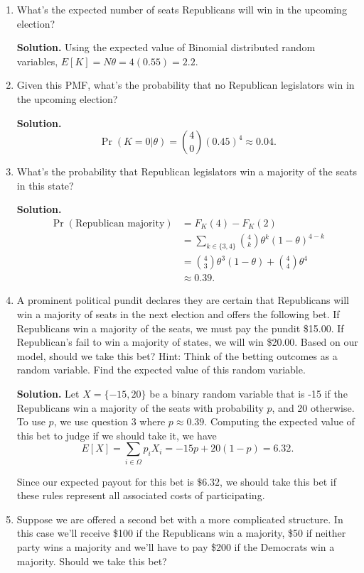 \documentclass[12pt]{article}
\begin{document}
\begin{enumerate}
    \item What’s the expected number of seats Republicans will win in the upcoming election?

    \textbf{Solution.} Using the expected value of Binomial distributed random variables, $E[K]=N\theta = 4(0.55)=2.2$.

    \item Given this PMF, what’s the probability that no Republican legislators win in the upcoming election?

    \textbf{Solution.}
    \[ \Pr(K=0 | \theta) = \binom{4}{0}    (0.45)^{4} \approx 0.04. \]
    
    \item What’s the probability that Republican legislators win a majority of the seats in this state?

    \textbf{Solution.} 
    \begin{align*}
         \Pr(\text{Republican majority}) &= F_K(4)-F_K(2) 
         \\ &= \sum_{k\in\{3,4\}}\binom{4}{k}\theta^k    (1-\theta)^{4-k} 
         \\ &= \binom{4}{3}\theta^3    (1-\theta) + \binom{4}{4}\theta^4 
         \\ &\approx 0.39.
    \end{align*}

    \item  A prominent political pundit declares they are certain that Republicans will win a majority of seats in the next election and offers the following bet. If Republicans win a majority of the seats, we must pay the pundit \$15.00. If Republican’s fail to win a majority of states, we will win \$20.00. Based on our model, should we take this bet? Hint: Think of the betting outcomes as a random variable. Find the expected value of this random variable.

    \textbf{Solution.} Let $X=\{-15,20\}$ be a binary random variable that is -15 if the Republicans win a majority of the seats with probability $p$, and 20 otherwise. 
    To use $p$, we use question 3 where $p\approx 0.39$.
    Computing the expected value of this bet to judge if we should take it, we have 
    \[ E[X] = \sum_{i \in \Omega} p_iX_i = -15p + 20(1-p) =6.32. \]

    Since our expected payout for this bet is $\$6.32$, we should take this bet if these rules represent all associated costs of participating. 

    \item Suppose we are offered a second bet with a more complicated structure. In this case we’ll receive \$100 if the Republicans win a majority, \$50 if neither party wins a majority and we’ll have to pay \$200 if the Democrats win a majority. Should we take this bet?


\end{enumerate}
\end{document}
